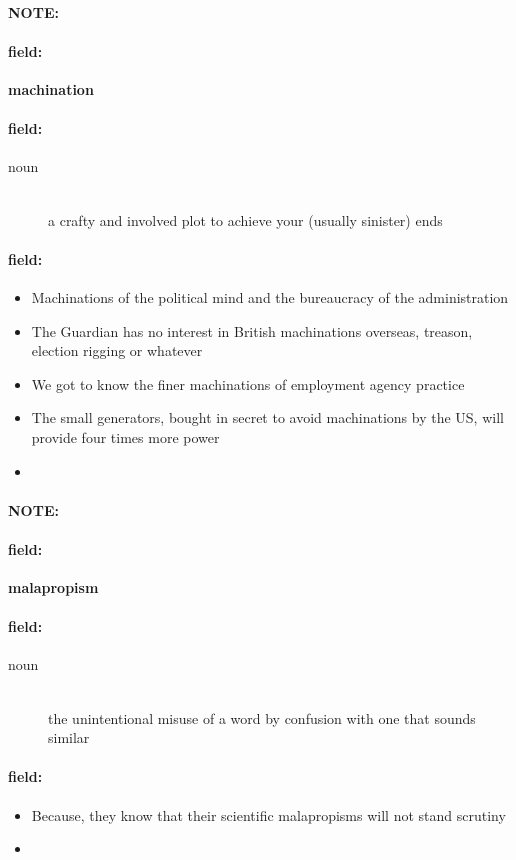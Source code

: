 \documentclass[12pt]{article}
\newenvironment{note}{\paragraph{NOTE:}}{}
\newenvironment{field}{\paragraph{field:}}{}
\begin{document}
\begin{note}
\begin{field}
\textbf{\large machination}
\end{field}


\begin{field}
\begin{description}
\item[noun] \hfill \\ 
a crafty and involved plot to achieve your (usually sinister) ends

\end{description}
\end{field}

\begin{field}
\begin{itemize}
\item Machinations of the political mind and the bureaucracy of the administration
\item The Guardian has no interest in British machinations overseas, treason, election rigging or whatever
\item We got to know the finer machinations of employment agency practice
\item The small generators, bought in secret to avoid machinations by the US, will provide four times more power
\item 
\end{itemize}
\end{field}
\end{note}
\begin{note}
\begin{field}
\textbf{\large malapropism}
\end{field}


\begin{field}
\begin{description}
\item[noun] \hfill \\ 
the unintentional misuse of a word by confusion with one that sounds similar

\end{description}
\end{field}

\begin{field}
\begin{itemize}
\item Because, they know that their scientific malapropisms will not stand scrutiny
\item 
\end{itemize}
\end{field}
\end{note}
\end{document}
